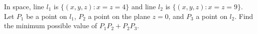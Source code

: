 In space, line $l_1$ is $\{(x,y,z): x=z=4\}$ and line $l_2$ is $\{(x,y,z): x=z=9\}$. Let $P_1$ be a point on $l_1$, $P_2$ a point on the plane $z=0$, and $P_3$ a point on $l_2$. Find the minimum possible value of $P_1P_2+P_2P_3$.

